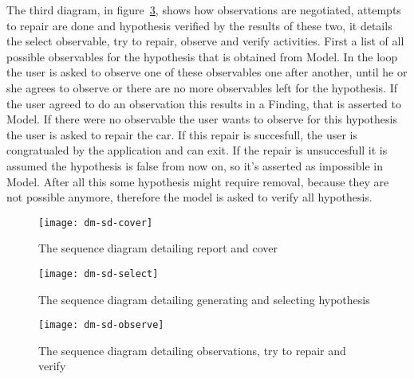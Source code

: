 The third diagram, in figure~\ref{fig:dm:sd observe}, shows how observations are
negotiated, attempts to repair are done and hypothesis verified by the
results of these two, it details the select observable, try to repair, observe
and verify activities. First a list of all  possible observables for the
hypothesis that is obtained from Model. In the loop the user is asked to observe one of
these observables one after another, until he or she agrees to observe or there
are no more observables left for the hypothesis. If the user agreed to do an
observation this results in a Finding, that is asserted to Model. If there were
no observable the user wants to observe for this hypothesis the user is asked to
repair the car. If this repair is succesfull, the user is congratualed by the
application and can exit. If the repair is unsuccesfull it is assumed the
hypothesis is false from now on, so it's asserted as impossible in Model. After
all this some hypothesis might require removal, because they are not possible
anymore, therefore the model is asked to verify all hypothesis.

\begin{figure}[htbp]
    \centering
    \texttt{[image: dm-sd-cover]}
    \caption{The sequence diagram detailing report and cover}
    \label{fig:dm:sd cover}
\end{figure}

\begin{figure}[htbp]
    \centering
    \texttt{[image: dm-sd-select]}
    \caption{The sequence diagram detailing generating and selecting hypothesis}
    \label{fig:dm:sd select}
\end{figure}

\begin{figure}[htbp]
    \centering
    \texttt{[image: dm-sd-observe]}
    \caption{The sequence diagram detailing observations, try to repair and verify}
    \label{fig:dm:sd observe}
\end{figure}

